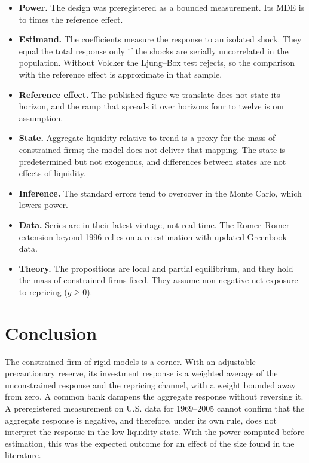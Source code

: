 \documentclass[11pt]{article}
\theoremstyle{remark}
\begin{document}
\begin{itemize}
\item \textbf{Power.} The design was preregistered as a bounded measurement. Its MDE is \MdeHetC{} to \MdeHomoC{} times the reference effect.
\item \textbf{Estimand.} The coefficients measure the response to an isolated shock. They equal the total response only if the
shocks are serially uncorrelated in the population. Without Volcker the Ljung--Box test rejects, so the comparison with the
reference effect is approximate in that sample.
\item \textbf{Reference effect.} The published figure we translate does not state its horizon, and the ramp that spreads it over
horizons four to twelve is our assumption.
\item \textbf{State.} Aggregate liquidity relative to trend is a proxy for the mass of constrained firms; the model does not
deliver that mapping. The state is predetermined but not exogenous, and differences between states are not effects of liquidity.
\item \textbf{Inference.} The standard errors tend to overcover in the Monte Carlo, which lowers power.
\item \textbf{Data.} Series are in their latest vintage, not real time. The Romer--Romer extension beyond 1996 relies on a
re-estimation with updated Greenbook data.
\item \textbf{Theory.} The propositions are local and partial equilibrium, and they hold the mass of constrained firms fixed. They
assume non-negative net exposure to repricing ($g\ge0$).
\end{itemize}

\section{Conclusion}\label{sec:conclusion}

The constrained firm of rigid models is a corner. With an adjustable precautionary reserve, its investment response is a weighted
average of the unconstrained response and the repricing channel, with a weight bounded away from zero. A common bank dampens the
aggregate response without reversing it. A preregistered measurement on U.S. data for 1969--2005 cannot confirm that the aggregate
response is negative, and therefore, under its own rule, does not interpret the response in the low-liquidity state. With the
power computed before estimation, this was the expected outcome for an effect of the size found in the literature.
\end{document}
